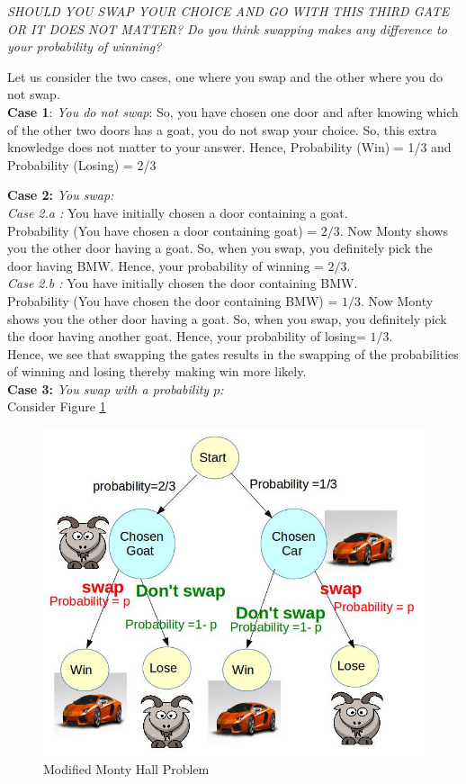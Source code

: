 \documentclass{llncs}
\begin{document}
\textit{SHOULD YOU SWAP YOUR CHOICE AND GO WITH THIS THIRD GATE OR IT DOES NOT MATTER? Do you think swapping makes any difference to your probability of winning?}

Let us consider the two cases, one where you swap and the other where you do not swap. \\

\textbf{Case 1}:\textit{ You do not swap}: So, you have chosen one door and after knowing which of the other two doors has a goat, you do not swap your choice. So, this extra knowledge does not matter to your answer.
Hence, Probability (Win) = 1/3 and Probability (Losing) = 2/3

\textbf{Case 2:} \textit{You swap:}\\ 
\textit{Case 2.a :} You have initially chosen a door containing a goat.\\ 
Probability (You have chosen a door containing goat) = $2/3$. Now Monty shows you the other door having a goat. So, when you swap, you definitely pick the door having BMW. Hence, your probability of winning = $2/3$.\\

\textit{Case 2.b : }You have initially chosen the door containing BMW.\\ 
Probability (You have chosen the door containing BMW) = $1/3$. Now Monty shows you the other door having a goat. So, when you swap, you definitely pick the door having another goat. Hence, your probability of losing= $1/3$.\\

Hence, we see that swapping the gates results in the swapping of the probabilities of winning and losing thereby making win more likely. \\

\textbf{Case 3:} \textit{You swap with a probability $p$:}\\

Consider Figure \ref{modi}
\begin{figure}[h]
\centering
\includegraphics[width=\textwidth]{goat.jpg}
\caption{Modified Monty Hall Problem}
\label{modi}
\end{figure}
\end{document}
